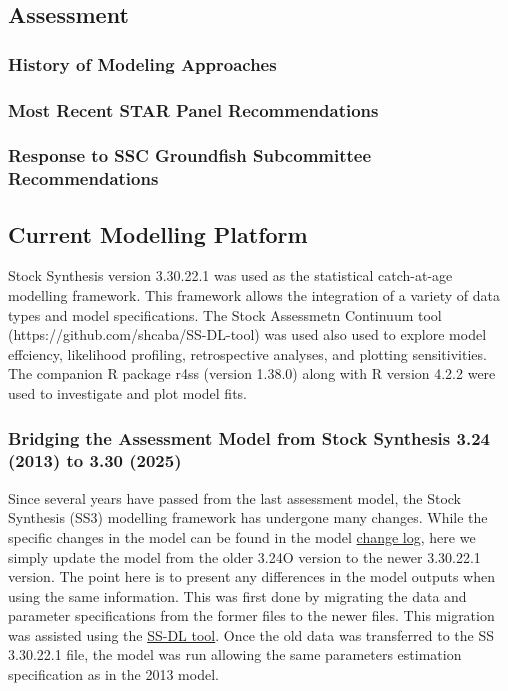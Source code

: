 \documentclass[
]{scrartcl}
\begin{document}
\newpage{}

\subsection{Assessment}\label{assessment}

\subsubsection{History of Modeling
Approaches}\label{history-of-modeling-approaches}

\subsubsection{Most Recent STAR Panel
Recommendations}\label{most-recent-star-panel-recommendations}

\subsubsection{Response to SSC Groundfish Subcommittee
Recommendations}\label{response-to-ssc-groundfish-subcommittee-recommendations}

\subsection{Current Modelling
Platform}\label{current-modelling-platform}

Stock Synthesis version 3.30.22.1 was used as the statistical
catch-at-age modelling framework. This framework allows the integration
of a variety of data types and model specifications. The Stock
Assessmetn Continuum tool (https://github.com/shcaba/SS-DL-tool) was
used also used to explore model effciency, likelihood profiling,
retrospective analyses, and plotting sensitivities. The companion R
package r4ss (version 1.38.0) along with R version 4.2.2 were used to
investigate and plot model fits.

\subsubsection{Bridging the Assessment Model from Stock Synthesis 3.24
(2013) to 3.30
(2025)}\label{bridging-the-assessment-model-from-stock-synthesis-3.24-2013-to-3.30-2025}

Since several years have passed from the last assessment model, the
Stock Synthesis (SS3) modelling framework has undergone many changes.
While the specific changes in the model can be found in the model
\href{https://github.com/nmfs-stock-synthesis/stock-synthesis/blob/v3.30.19/Change_log_for_SS_3.30.xlsx?raw=true}{change
log}, here we simply update the model from the older 3.24O version to
the newer 3.30.22.1 version. The point here is to present any
differences in the model outputs when using the same information. This
was first done by migrating the data and parameter specifications from
the former files to the newer files. This migration was assisted using
the \href{https://github.com/shcaba/SS-DL-tool}{SS-DL tool}. Once the
old data was transferred to the SS 3.30.22.1 file, the model was run
allowing the same parameters estimation specification as in the 2013
model.
\end{document}

